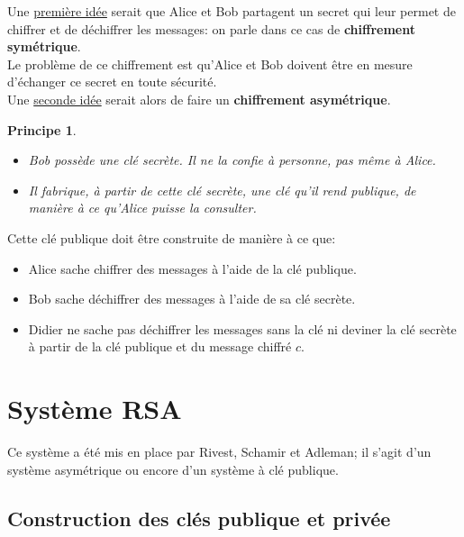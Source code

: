 \documentclass[10pt,a4paper]{report}
\newtheorem*{prin}{Principe}
\begin{document}
Une \underline{première idée} serait que Alice et Bob partagent un secret qui leur permet de chiffrer et de déchiffrer les messages: on parle dans ce cas de \textbf{chiffrement symétrique}.\\

Le problème de ce chiffrement est qu'Alice et Bob doivent être en mesure d'échanger ce secret en toute sécurité.\\

Une \underline{seconde idée} serait alors de faire un \textbf{chiffrement asymétrique}.

\begin{prin}\
\begin{itemize}
\item[•] Bob possède une clé secrète. Il ne la confie à personne, pas même à Alice.
\item[•] Il fabrique, à partir de cette clé secrète, une clé qu'il rend publique, de manière à ce qu'Alice puisse la consulter.
\end{itemize}
\end{prin}

Cette clé publique doit être construite de manière à ce que:
\begin{itemize}
\item[•] Alice sache chiffrer des messages à l'aide de la clé publique.
\item[•] Bob sache déchiffrer des messages à l'aide de sa clé secrète.
\item[•] Didier ne sache pas déchiffrer les messages sans la clé ni deviner la clé secrète à partir de la clé publique et du message chiffré $c$. 
\end{itemize}

\section{Système RSA}

Ce système a été mis en place par Rivest, Schamir et Adleman; il s'agit d'un système asymétrique ou encore d'un système à clé publique.


\subsection{Construction des clés publique et privée}
\end{document}
